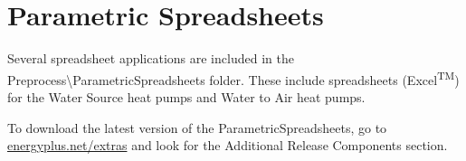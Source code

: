 \chapter{Parametric Spreadsheets}\label{parametric-spreadsheets}

Several spreadsheet applications are included in the Preprocess\textbackslash{}ParametricSpreadsheets folder. These include spreadsheets (Excel\textsuperscript{TM}) for the Water Source heat pumps and Water to Air heat pumps.

To download the latest version of the ParametricSpreadsheets, go to \href{https://energyplus.net/extras}{energyplus.net/extras} and look for the Additional Release Components section.
